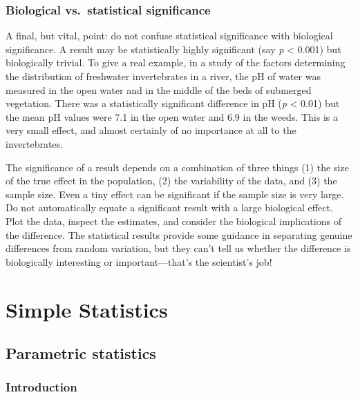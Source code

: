 \documentclass[
]{book}
\begin{document}
\hypertarget{biological-vs.-statistical-significance}{%
\section{Biological vs.~statistical significance}\label{biological-vs.-statistical-significance}}

A final, but vital, point: do not confuse statistical significance with biological significance. A result may be statistically highly significant (say \emph{p} \textless{} 0.001) but biologically trivial. To give a real example, in a study of the factors determining the distribution of freshwater invertebrates in a river, the pH of water was measured in the open water and in the middle of the beds of submerged vegetation. There was a statistically significant difference in pH (\emph{p} \textless{} 0.01) but the mean pH values were 7.1 in the open water and 6.9 in the weeds. This is a very small effect, and almost certainly of no importance at all to the invertebrates.

The significance of a result depends on a combination of three things (1) the size of the true effect in the population, (2) the variability of the data, and (3) the sample size. Even a tiny effect can be significant if the sample size is very large. Do not automatically equate a significant result with a large biological effect. Plot the data, inspect the estimates, and consider the biological implications of the difference. The statistical results provide some guidance in separating genuine differences from random variation, but they can't tell us whether the difference is biologically interesting or important---that's the scientist's job!

\hypertarget{part-simple-statistics}{%
\part{Simple Statistics}\label{part-simple-statistics}}

\hypertarget{parametric-statistics}{%
\chapter{Parametric statistics}\label{parametric-statistics}}

\hypertarget{introduction}{%
\section{Introduction}\label{introduction}}
\end{document}
